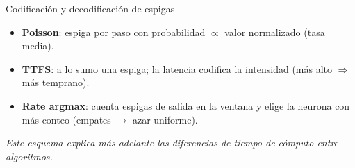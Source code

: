 \documentclass[aspectratio=169,10pt]{beamer}
\begin{document}
\begin{frame}{Codificación y decodificación de espigas}
\begin{center}
  \end{center}
  \begin{itemize}\small
    \item \textbf{Poisson}: espiga por paso con probabilidad $\propto$ valor normalizado (tasa media).
    \item \textbf{TTFS}: a lo sumo una espiga; la latencia codifica la intensidad (más alto $\Rightarrow$ más temprano).
    \item \textbf{Rate argmax}: cuenta espigas de salida en la ventana y elige la neurona con más conteo (empates $\rightarrow$ azar uniforme).
  \end{itemize}
  \centering\footnotesize\textit{Este esquema explica más adelante las diferencias de tiempo de cómputo entre algoritmos.}
\end{frame}
\end{document}
